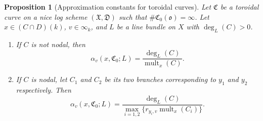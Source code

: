 \documentclass[a4paper, twoside, 11pt]{amsart}
\newtheorem{proposition}[theorem]{Proposition}
\theoremstyle{definition}
\newcommand{\mC}{\mathfrak{C}}
\newcommand{\mD}{\mathfrak{D}}
\newcommand{\mX}{\mathfrak{X}}
\newcommand{\fo}{\mathfrak{o}}
\DeclareMathOperator{\mult}{mult}
\begin{document}
\begin{proposition}[Approximation constants for toroidal curves]\label{prop:approximation-toroidal}
Let $\mC$ be a toroidal curve on a nice log scheme  $(\mX,\mD)$ such that $\#\mC_0(\fo) = \infty$.
Let $x\in (C\cap D)(k)$,  $v\in\infty_k$, and $L$ be a line bundle on $X$ with $\deg_L(C) > 0$.
\begin{enumerate}
 \item If $C$ is not nodal, then
	\begin{equation*}
		\alpha_v(x,\mC_0;L) = \frac{\deg_{L}(C)}{\mult_{x}(C)}.
	\end{equation*}
    \item If $C$ is nodal, let $C_1$ and $C_2$ be its two branches corresponding to $y_1$ and $y_2$ respectively. Then
	\begin{equation*}
	\alpha_v(x,\mC_0;L) =
        \frac{\deg_{L}(C)}{\max_{i=1,2}\{r_{y_i,v}\mult_{x}(C_i)\}}.
	\end{equation*}
\end{enumerate}  
\end{proposition}
\end{document}
